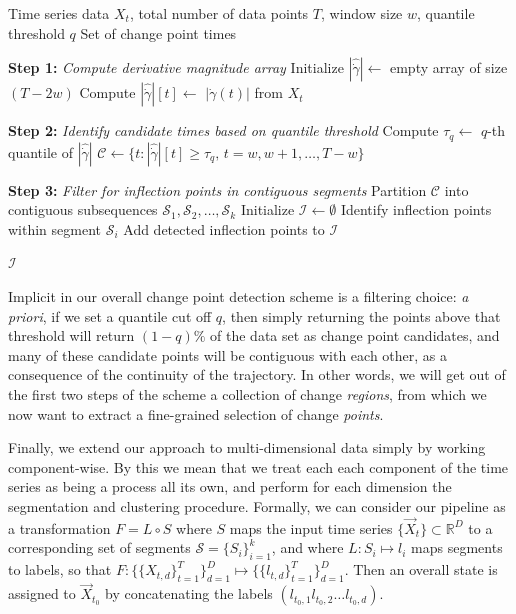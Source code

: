 \documentclass{article}
\newcommand{\R}{\mathbb{R}}
\begin{document}
\begin{algorithm}
\label{CPDAlg}
\caption{Change Point Detection Algorithm (ComputeChangePoints)}
\begin{algorithmic}[1]
\Require Time series data $X_t$, total number of data points $T$, window size $w$, quantile threshold $q$
\Ensure Set of change point times

\State \textbf{Step 1:} \textit{Compute derivative magnitude array}
\State Initialize $\left|\hat{\dot{\gamma}}\right| \gets $ empty array of size $(T-2w)$
    \State Compute $|\hat{\dot{\gamma}}|[t] \gets $  $|\dot{\gamma}(t)|$ from $X_t$
\EndFor

\State
\State \textbf{Step 2:} \textit{Identify candidate times based on quantile threshold}
\State Compute $\tau_q \gets$ $q$-th quantile of $|\hat{\dot{\gamma}}|$
\State $\mathcal{C} \gets \{t : |\hat{\dot{\gamma}}|[t] \geq \tau_q, \, t=w, w+1, \dots, T-w\}$ 

\State
\State \textbf{Step 3:} \textit{Filter for inflection points in contiguous segments}
\State Partition $\mathcal{C}$ into contiguous subsequences $\mathcal{S}_1, \mathcal{S}_2, \ldots, \mathcal{S}_k$
\State Initialize $\mathcal{I} \gets \emptyset$ 
    \State Identify inflection points within segment $\mathcal{S}_i$
    \State Add detected inflection points to $\mathcal{I}$
\EndFor

\State \Return $\mathcal{I}$
\end{algorithmic}
\end{algorithm}

Implicit in our overall change point detection scheme is a filtering choice: \textit{a priori}, if we set a quantile cut off \(q\), then simply returning the points above that threshold will return \((1-q)\%\) of the data set as change point candidates, and many of these candidate points will be contiguous with each other, as a consequence of the continuity of the trajectory. In other words, we will get out of the first two steps of the scheme a collection of change \textit{regions}, from which we now want to extract a fine-grained selection of change \textit{points}. 

Finally, we extend our approach to multi-dimensional data simply by working component-wise. By this we mean that we treat each each component of the time series as being a process all its own, and perform for each dimension the segmentation and clustering procedure. Formally, we can consider our pipeline as a transformation \(F=L\circ S\) where \(S\) maps the input time series \(\{\vec{X}_t\} \subset \R^D\) to a corresponding set of segments \(\mathcal{S} = \{S_i\}_{i=1}^k\), and where \(L: S_i \mapsto l_i\) maps segments to labels, so that  \(F: \{\{X_{t,d}\}_{t=1}^T\}_{d=1}^D \mapsto \{\{l_{t,d}\}_{t=1}^T\}_{d=1}^D\). Then an overall state is assigned to \(\vec{X}_{t_0}\) by concatenating the labels \((l_{t_0,1}l_{t_0, 2}\dots l_{t_0,d})\).
\end{document}
